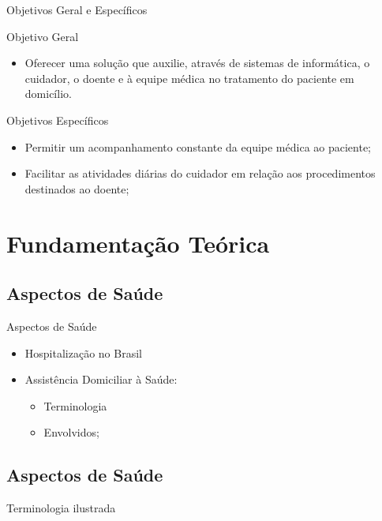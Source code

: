 \documentclass{beamer}
\begin{document}
\begin{frame}{Objetivos Geral e Específicos}
\begin{block}{Objetivo Geral}
  \begin{itemize}
    \item Oferecer uma solução que auxilie, através de sistemas de 
    informática, o cuidador, o doente e à equipe médica no tratamento do 
    paciente em domicílio.
  \end{itemize}
\end{block}
\vspace{-.5em}

\begin{block}{Objetivos Específicos}
  \begin{itemize}
    \item Permitir um acompanhamento constante da equipe médica ao paciente;
    \item Facilitar as atividades diárias do cuidador em relação aos 
    procedimentos destinados ao doente;
  \end{itemize}
\end{block}

\end{frame}

\section{Fundamentação Teórica}

\subsection{Aspectos de Saúde}
\begin{frame}{Aspectos de Saúde}
  \begin{itemize}
    \item Hospitalização no Brasil 
    \item Assistência Domiciliar à Saúde:
      \begin{itemize}
        \item Terminologia 
        \item Envolvidos;
      \end{itemize}
  \end{itemize}
\end{frame}

\subsection{Aspectos de Saúde}
\begin{frame}{Terminologia ilustrada}

\end{frame}
\end{document}
